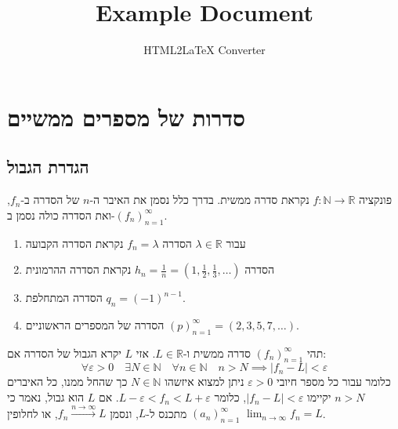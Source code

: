 \documentclass{tstextbook}
\begin{document}
\title{Example Document}
\author{HTML2LaTeX Converter}
\maketitle

\section{סדרות של מספרים ממשיים}

\subsection{הגדרת הגבול}

\begin{definition}
פונקציה \(f:\mathbb{N}\to \mathbb{R}\) נקראת סדרה ממשית. בדרך כלל נסמן את האיבר ה-\(n\) של הסדרה ב-\(f_{n}\), ואת הסדרה כולה נסמן ב-\((f_{n})_{n=1}^{\infty}\).

\end{definition}
\begin{example}
  \begin{enumerate}
    \item עבור \(\lambda \in \mathbb{R}\) הסדרה \(f_{n}=\lambda\) נקראת הסדרה הקבועה 


    \item הסדרה \(h_{n}=\frac{1}{n}=\left( 1,\frac{1}{2},\frac{1}{3},\dots \right)\) נקראת הסדרה ההרמונית 


    \item הסדרה המתחלפת \(q_{n}=(-1)^{n-1}\).  


    \item הסדרה של המספרים הראשוניים \((p)_{n=1}^{\infty}=\left( 2,3,5,7,\dots \right)\). 


  \end{enumerate}
\end{example}
\begin{definition}
תהי \((f_{n})_{n=1}^{\infty}\) סדרה ממשית ו-\(L \in \mathbb{R}\). אזי \(L\) יקרא הגבול של הסדרה אם:
$$\forall\varepsilon>0\quad \exists N \in \mathbb{N}\quad \forall n\in \mathbb{N}\quad n>N\implies |f_{n}-L|<\varepsilon$$
כלומר עבור כל מספר חיובי \(\varepsilon>0\) ניתן למצוא איזשהו \(N \in \mathbb{N}\) כך שהחל ממנו, כל האיברים \(n>N\) יקיימו \(|f_{n}-L|<\varepsilon\), כלומר \(L-\varepsilon<f_{n}<L+\varepsilon\).
אם \(L\) הוא גבול, נאמר כי \((a_n)_{n=1}^\infty\) מתכנס ל-\(L\), ונסמן \(f_{n}\xrightarrow{n\to \infty}L\), או לחלופין \(\lim_{ n \to \infty }f_{n}=L\).

\end{definition}
\end{document}
